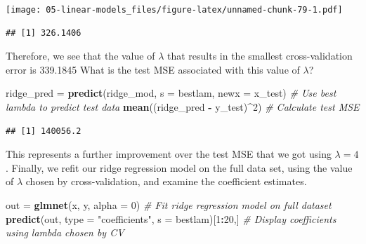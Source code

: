 \documentclass[openany]{book}
\newenvironment{Shaded}{\begin{snugshade}}{\end{snugshade}}
\newcommand{\CommentTok}[1]{\textcolor[rgb]{0.56,0.35,0.01}{\textit{#1}}}
\newcommand{\DataTypeTok}[1]{\textcolor[rgb]{0.13,0.29,0.53}{#1}}
\newcommand{\DecValTok}[1]{\textcolor[rgb]{0.00,0.00,0.81}{#1}}
\newcommand{\KeywordTok}[1]{\textcolor[rgb]{0.13,0.29,0.53}{\textbf{#1}}}
\newcommand{\NormalTok}[1]{#1}
\newcommand{\OperatorTok}[1]{\textcolor[rgb]{0.81,0.36,0.00}{\textbf{#1}}}
\newcommand{\StringTok}[1]{\textcolor[rgb]{0.31,0.60,0.02}{#1}}
\begin{document}
\texttt{[image: 05-linear-models\_files/figure-latex/unnamed-chunk-79-1.pdf]}

\begin{Shaded}
\end{Shaded}

\begin{verbatim}
## [1] 326.1406
\end{verbatim}

Therefore, we see that the value of \(\lambda\) that results in the smallest cross-validation
error is 339.1845 What is the test MSE associated with this value of
\(\lambda\)?

\begin{Shaded}
\begin{Highlighting}[]
\NormalTok{ridge_pred =}\StringTok{ }\KeywordTok{predict}\NormalTok{(ridge_mod, }\DataTypeTok{s =}\NormalTok{ bestlam, }\DataTypeTok{newx =}\NormalTok{ x_test) }\CommentTok{# Use best lambda to predict test data}
\KeywordTok{mean}\NormalTok{((ridge_pred }\OperatorTok{-}\StringTok{ }\NormalTok{y_test)}\OperatorTok{^}\DecValTok{2}\NormalTok{) }\CommentTok{# Calculate test MSE}
\end{Highlighting}
\end{Shaded}

\begin{verbatim}
## [1] 140056.2
\end{verbatim}

This represents a further improvement over the test MSE that we got using
\(\lambda = 4\). Finally, we refit our ridge regression model on the full data set,
using the value of \(\lambda\) chosen by cross-validation, and examine the coefficient
estimates.

\begin{Shaded}
\begin{Highlighting}[]
\NormalTok{out =}\StringTok{ }\KeywordTok{glmnet}\NormalTok{(x, y, }\DataTypeTok{alpha =} \DecValTok{0}\NormalTok{) }\CommentTok{# Fit ridge regression model on full dataset}
\KeywordTok{predict}\NormalTok{(out, }\DataTypeTok{type =} \StringTok{"coefficients"}\NormalTok{, }\DataTypeTok{s =}\NormalTok{ bestlam)[}\DecValTok{1}\OperatorTok{:}\DecValTok{20}\NormalTok{,] }\CommentTok{# Display coefficients using lambda chosen by CV}
\end{Highlighting}
\end{Shaded}
\end{document}
